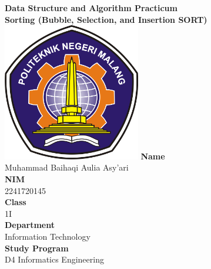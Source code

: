 \documentclass[12pt,titlepage]{article}
\newcommand{\vSubject}{Data Structure and Algorithm Practicum}
\newcommand{\vSubtitle}{Sorting (Bubble, Selection, and Insertion SORT)}
\newcommand{\vName}{Muhammad Baihaqi Aulia Asy'ari}
\newcommand{\vNIM}{2241720145}
\newcommand{\vClass}{1I}
\newcommand{\vDepartment}{Information Technology}
\newcommand{\vStudyProgram}{D4 Informatics Engineering}
\begin{document}
\begin{titlepage}
    \centering
    \vfill
    {\bfseries\LARGE
        \vSubject\\
        \vskip0.25cm
        \vSubtitle
    }
    \vfill
    \includegraphics[width=6cm]{images/polinema-logo.png}
    \vfill
    {
        \textbf{Name}\\
        \vName\\
        \vskip0.5cm
        \textbf{NIM}\\
        \vNIM\\
        \vskip0.5cm
        \textbf{Class}\\
        \vClass\\
        \vskip0.5cm
        \textbf{Department}\\
        \vDepartment\\
        \vskip0.5cm
        \textbf{Study Program}\\
        \vStudyProgram
    }
\end{titlepage}

\newpage
\end{document}

